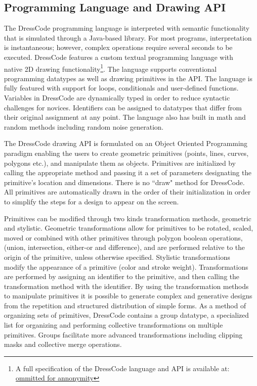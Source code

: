 \documentclass{sigchi}
\begin{document}
\subsection{Programming Language and Drawing API}
The DressCode programming language is interpreted with semantic functionality that is simulated through a Java-based library. For most programs, interpretation is instantaneous; however, complex operations require several seconds to be executed. DressCode features a custom textual programming language with native 2D drawing functionality\footnote{A full specification of the DressCode language and API is available at: \url{ommitted for annonymity}}. The language supports conventional programming datatypes as well as drawing primitives in the API. The language is fully featured with support for loops, conditionals and user-defined functions. Variables in DressCode are dynamically typed in order to reduce syntactic challenges for novices. Identifiers can be assigned to datatypes that differ from their original assignment at any point. The language also has built in math and random methods including random noise generation.

The DressCode drawing API is formulated on an Object Oriented Programming paradigm enabling the users to create geometric primitives (points, lines, curves, polygons etc.), and manipulate them as objects. Primitives are initialized by calling the appropriate method and passing it a set of parameters designating the primitive's location and dimensions. There is no ``draw" method for DressCode. All primitives are automatically drawn in the order of their initialization in order to simplify the steps for a design to appear on the screen.
 
Primitives can be modified through two kinds transformation methods, geometric and stylistic. Geometric transformations allow for primitives to be rotated, scaled, moved or combined with other primitives through polygon boolean operations, (union, intersection, either-or and difference), and are performed relative to the origin of the primitive, unless otherwise specified. Stylistic transformations modify the appearance of a primitive (color and stroke weight). Transformations are performed by assigning an identifier to the primitive, and then calling the transformation method with the identifier. By using the transformation methods to manipulate primitives it is possible to generate complex and generative designs from the repetition and structured distribution of simple forms. As a method of organizing sets of primitives, DressCode contains a group datatype, a specialized list for organizing and performing collective transformations on multiple primitives. Groups facilitate more advanced transformations including clipping masks and collective merge operations. 
\end{document}
